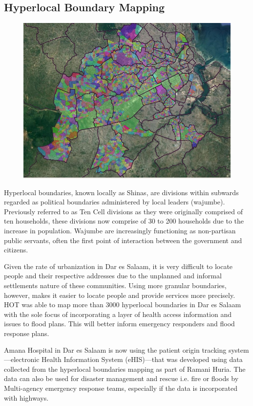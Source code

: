 \documentclass[a4paper,12pt,twoside]{article}
\begin{document}
\subsection{Hyperlocal Boundary Mapping}
\begin{figure}[h]
    \centering
    \includegraphics[width=.8\textwidth]{images/shinaexample.jpeg}
    \label{fig:my_label}
\end{figure}

Hyperlocal boundaries, known locally as Shinas, are divisions within subwards regarded as political boundaries administered by local leaders (wajumbe). Previously referred to as Ten Cell divisions as they were originally comprised of ten households, these divisions now comprise of 30 to 200 households due to the increase in population. Wajumbe are increasingly functioning as non-partisan public servants, often the first point of interaction between the government and citizens.

Given the rate of urbanization in Dar es Salaam, it is very difficult to locate people and their respective addresses due to the unplanned and informal settlements nature of these communities. Using more granular boundaries, however, makes it easier to locate people and provide services more precisely. HOT was able to map more than 3000 hyperlocal boundaries in Dar es Salaam with the sole focus of incorporating a layer of health access information and issues to flood plans. This will better inform emergency responders and flood response plans. 

Amana Hospital in Dar es Salaam is now using the patient origin tracking system---electronic Health Information System (eHIS)---that was developed using data collected from the hyperlocal boundaries mapping as part of Ramani Huria. The data can also be used for disaster management and rescue i.e. fire or floods by Multi-agency emergency response teams, especially if the data is incorporated with highways.
\newpage
\end{document}
